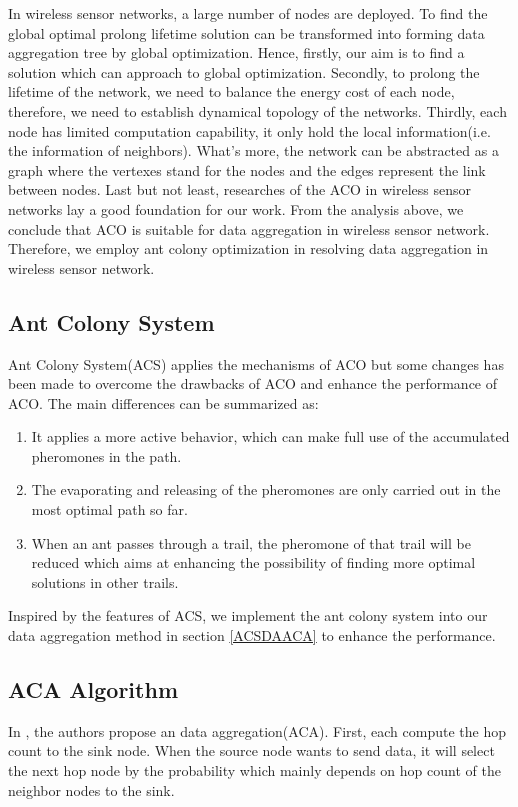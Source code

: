 \documentclass{elsarticle}
\begin{document}
In wireless sensor networks, a large number of nodes are deployed. To find the global optimal prolong lifetime solution can be transformed into forming data aggregation tree by global optimization. Hence, firstly, our aim is to find a solution which can approach to global optimization. Secondly, to prolong the lifetime of the network, we need to balance the energy cost of each node, therefore, we need to establish dynamical topology of the networks. Thirdly, each node has limited computation capability, it only hold the local information(i.e. the information of neighbors). What's more, the network can be abstracted as a graph where the vertexes stand for the nodes and the edges represent the link between nodes. Last but not least, researches of the ACO in wireless sensor networks\cite{label-10,label-42,label-43} lay a good foundation for our work. From the analysis above, we conclude that ACO is suitable for data aggregation in wireless sensor network. Therefore, we employ ant colony optimization in resolving data aggregation in wireless sensor network.

\subsection{Ant Colony System} \label{AntColonySystem}
Ant Colony System(ACS) applies the mechanisms of ACO but some changes has been made to overcome the drawbacks of ACO and enhance the performance of ACO.
The main differences can be summarized as:
\begin{enumerate}
\item It applies a more active behavior, which can make full use of the accumulated pheromones in the path.
\item The evaporating and releasing of the pheromones are only carried out in the most optimal path so far.
\item When an ant passes through a trail, the pheromone of that trail will be reduced which aims at enhancing the possibility of finding more optimal solutions in other trails.
\end{enumerate}

Inspired by the features of ACS, we implement the ant colony system into our data aggregation method in section \ref{ACSDAACA} to enhance the performance.


\subsection{ACA Algorithm} \label{ACAAlgorithm}
In \cite{label-10}, the authors propose an data aggregation(ACA). First, each compute the hop count to the sink node. When the source node wants to send data, it will select the next hop node by the probability which mainly depends on hop count of the neighbor nodes to the sink.
\end{document}
